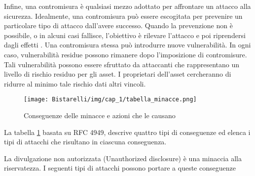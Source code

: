 Infine, una contromisura è qualsiasi mezzo adottato per affrontare un attacco alla sicurezza. Idealmente, una contromisura può essere escogitata per prevenire un particolare tipo di attacco dall'avere successo. Quando la prevenzione non è possibile, o in alcuni casi fallisce, l'obiettivo è rilevare l'attacco e poi riprendersi dagli effetti . Una contromisura stessa può introdurre nuove vulnerabilità. In ogni caso, vulnerabilità residue
possono rimanere dopo l'imposizione di contromisure. Tali vulnerabilità possono essere sfruttato da attaccanti che rappresentano un livello di rischio residuo per gli asset. I proprietari dell'asset cercheranno di ridurre al minimo tale rischio dati altri vincoli.


\begin{figure}[H]
	\centering
    \texttt{[image: Bistarelli/img/cap\_1/tabella\_minacce.png]}
	\caption{Conseguenze delle minacce e azioni che le causano }\label{fig:tabella_minacce}
\end{figure}

La tabella \ref{fig:tabella_minacce} basata su RFC 4949, descrive quattro tipi di conseguenze ed elenca i tipi di attacchi che risultano in ciascuna conseguenza. 

La divulgazione non autorizzata (Unauthorized disclosure) è una minaccia alla riservatezza. I seguenti tipi di attacchi possono portare a queste conseguenze

